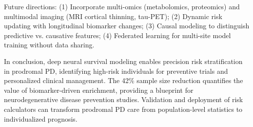 Future directions: (1) Incorporate multi-omics (metabolomics, proteomics\cite{maass2020multimodal}) and multimodal imaging (MRI cortical thinning\cite{zeighami2019network}, tau-PET\cite{passamonti2017tau}); (2) Dynamic risk updating with longitudinal biomarker changes; (3) Causal modeling to distinguish predictive vs. causative features; (4) Federated learning for multi-site model training without data sharing\cite{rieke2020future}.

In conclusion, deep neural survival modeling enables precision risk stratification in prodromal PD, identifying high-risk individuals for preventive trials and personalized clinical management. The 42\% sample size reduction quantifies the value of biomarker-driven enrichment, providing a blueprint for neurodegenerative disease prevention studies. Validation and deployment of risk calculators can transform prodromal PD care from population-level statistics to individualized prognosis.
